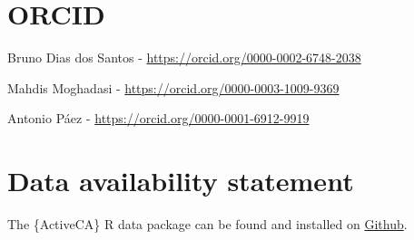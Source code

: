 \documentclass[Royal,times,sageh]{sagej}
\begin{document}
\section{ORCID}\label{orcid}

Bruno Dias dos Santos - \url{https://orcid.org/0000-0002-6748-2038}

Mahdis Moghadasi - \url{https://orcid.org/0000-0003-1009-9369}

Antonio Páez - \url{https://orcid.org/0000-0001-6912-9919}

\section{Data availability statement}\label{data-availability-statement}

The \{ActiveCA\} R data package can be found and installed on
\href{https://github.com/dias-bruno/ActiveCA}{Github}.



\end{document}
